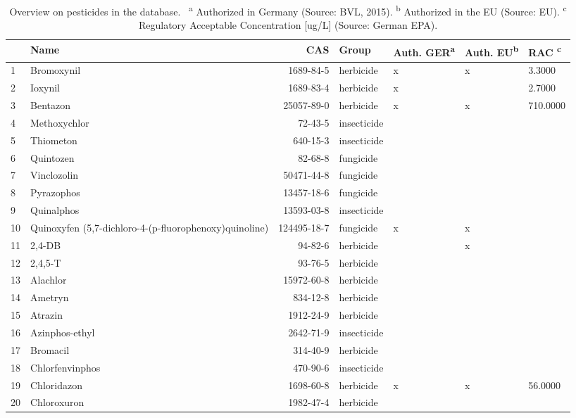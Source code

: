 \begin{longtable}{lp{3cm}rlp{0.5cm}p{0.5cm}p{1.5cm}}
\caption[Overview on pesticides in the database.]{Overview on pesticides in the database. \
                    \textsuperscript{a} Authorized in Germany (Source: BVL, 2015). 
                    \textsuperscript{b} Authorized in the EU (Source: EU).
                    \textsuperscript{c} Regulatory Acceptable Concentration [ug/L] (Source: German EPA).} \\ 
  \toprule
 & Name & CAS & Group & Auth. GER\textsuperscript{a} & Auth. EU\textsuperscript{b} & RAC \textsuperscript{c} \\ 
  \midrule
1 & Bromoxynil & 1689-84-5 & herbicide & x & x & 3.3000 \\ 
  2 & Ioxynil & 1689-83-4 & herbicide & x &  & 2.7000 \\ 
  3 & Bentazon & 25057-89-0 & herbicide & x & x & 710.0000 \\ 
  4 & Methoxychlor & 72-43-5 & insecticide &  &  &  \\ 
  5 & Thiometon & 640-15-3 & insecticide &  &  &  \\ 
  6 & Quintozen & 82-68-8 & fungicide &  &  &  \\ 
  7 & Vinclozolin & 50471-44-8 & fungicide &  &  &  \\ 
  8 & Pyrazophos & 13457-18-6 & fungicide &  &  &  \\ 
  9 & Quinalphos & 13593-03-8 & insecticide &  &  &  \\ 
  10 & Quinoxyfen (5,7-dichloro-4-(p-fluorophenoxy)quinoline) & 124495-18-7 & fungicide & x & x &  \\ 
  11 & 2,4-DB & 94-82-6 & herbicide &  & x &  \\ 
  12 & 2,4,5-T & 93-76-5 & herbicide &  &  &  \\ 
  13 & Alachlor & 15972-60-8 & herbicide &  &  &  \\ 
  14 & Ametryn & 834-12-8 & herbicide &  &  &  \\ 
  15 & Atrazin & 1912-24-9 & herbicide &  &  &  \\ 
  16 & Azinphos-ethyl & 2642-71-9 & insecticide &  &  &  \\ 
  17 & Bromacil & 314-40-9 & herbicide &  &  &  \\ 
  18 & Chlorfenvinphos & 470-90-6 & insecticide &  &  &  \\ 
  19 & Chloridazon & 1698-60-8 & herbicide & x & x & 56.0000 \\ 
  20 & Chloroxuron & 1982-47-4 & herbicide &  &  &  \\ 

\end{longtable}
